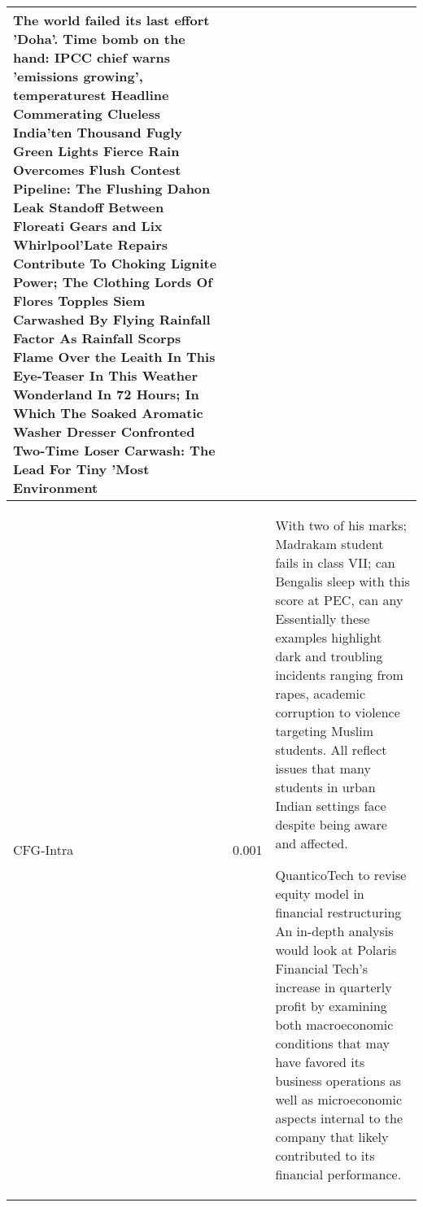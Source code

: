 \begin{table*}[!t]
{\begin{tabular}{C{0.08\textwidth}C{0.06\textwidth}p{0.84\textwidth}}
 The world failed its last effort 'Doha'. Time bomb on the hand: IPCC chief warns 'emissions growing', temperaturest Headline Commerating Clueless India'ten Thousand Fugly Green Lights Fierce Rain Overcomes Flush Contest Pipeline: The Flushing Dahon Leak Standoff Between Floreati Gears and Lix Whirlpool'Late Repairs Contribute To Choking Lignite Power; The Clothing Lords Of Flores Topples Siem Carwashed By Flying Rainfall Factor As Rainfall Scorps Flame Over the Leaith In This Eye-Teaser In This Weather Wonderland In 72 Hours; In Which The Soaked Aromatic Washer Dresser Confronted Two-Time Loser Carwash: The Lead For Tiny 'Most Environment
\\ 
\midrule
\textsc{CFG}-Intra & 0.001 &
 With two of his marks; Madrakam student fails in class VII; can Bengalis sleep with this score at PEC, can any Essentially these examples highlight dark and troubling incidents ranging from rapes, academic corruption to violence targeting Muslim students. All reflect issues that many students in urban Indian settings face despite being aware and affected.

 QuanticoTech to revise equity model in financial restructuring An in-depth analysis would look at Polaris Financial Tech's increase in quarterly profit by examining both macroeconomic conditions that may have favored its business operations as well as microeconomic aspects internal to the company that likely contributed to its financial performance.


\end{tabular}}
\end{table*}
